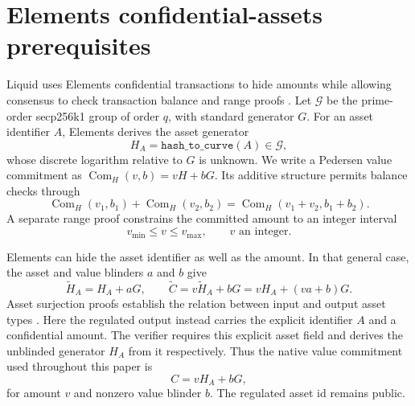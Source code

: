 \documentclass[11pt]{article}
\begin{document}
    \section{Elements confidential-assets prerequisites}
    \label{sec:elements}

    Liquid uses Elements confidential transactions to hide amounts while allowing consensus to check transaction balance and range proofs \cite{liquid,confidential-assets}.
    Let $\mathcal{G}$ be the prime-order secp256k1 group of order $q$, with standard generator $G$.
    For an asset identifier $A$, Elements derives the asset generator
    \[
        H_A=\texttt{hash\_to\_curve}(A)\in\mathcal{G},
    \]
    whose discrete logarithm relative to $G$ is unknown.
    We write a Pedersen value commitment as $\operatorname{Com}_{H}(v,b)=vH+bG$.
    Its additive structure permits balance checks through
    \[
        \operatorname{Com}_{H}(v_1,b_1)+\operatorname{Com}_{H}(v_2,b_2)
        =\operatorname{Com}_{H}(v_1+v_2,b_1+b_2).
    \]
    A separate range proof constrains the committed amount to an integer interval
    \[
        v_{\min}\leq v\leq v_{\max},\qquad v\text{ an integer}.
    \]

    Elements can hide the asset identifier as well as the amount.
    In that general case, the asset and value blinders $a$ and $b$ give
    \[
        \widetilde H_A=H_A+aG,
        \qquad
        \widetilde C=v\widetilde H_A+bG=vH_A+(va+b)G.
    \]
    Asset surjection proofs establish the relation between input and output asset types \cite{liquid,confidential-assets}.
    Here the regulated output instead carries the explicit identifier $A$ and a confidential amount.
    The verifier requires this explicit asset field and derives the unblinded generator $H_A$ from it respectively.
    Thus the native value commitment used throughout this paper is
    \begin{equation}
        C=vH_A+bG,
        \label{eq:commitment}
    \end{equation}
    for amount $v$ and nonzero value blinder $b$.
    The regulated asset id remains public.
\end{document}
